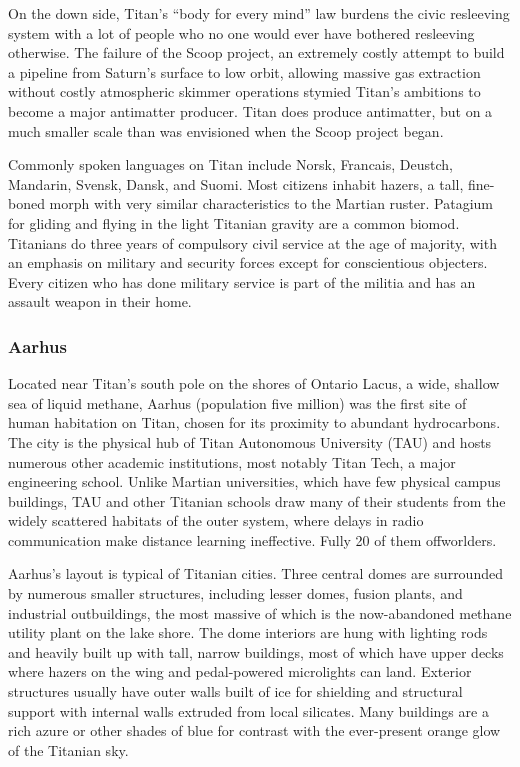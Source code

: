 On the down side, Titan's ``body for every mind'' 
law burdens the civic resleeving system with a lot of 
people who no one would ever have bothered resleeving
otherwise. The failure of the Scoop project, an
extremely costly attempt to build a pipeline from 
Saturn's surface to low orbit, allowing massive gas 
extraction without costly atmospheric skimmer operations
stymied Titan's ambitions to become a major
antimatter producer. Titan does produce antimatter, 
but on a much smaller scale than was envisioned 
when the Scoop project began.

Commonly spoken languages on Titan include 
Norsk, Francais, Deustch, Mandarin, Svensk, Dansk, 
and Suomi. Most citizens inhabit hazers, a tall, fine-boned
morph with very similar characteristics to
the Martian ruster. Patagium for gliding and flying 
in the light Titanian gravity are a common biomod. 
Titanians do three years of compulsory civil service 
at the age of majority, with an emphasis on military 
and security forces except for conscientious objecters. 
Every citizen who has done military service is part of 
the militia and has an assault weapon in their home.

\subsubsection{Aarhus}

Located near Titan's south pole on the shores of Ontario
Lacus, a wide, shallow sea of liquid methane,
Aarhus (population five million) was the first site of 
human habitation on Titan, chosen for its proximity 
to abundant hydrocarbons. The city is the physical 
hub of Titan Autonomous University (TAU) and hosts 
numerous other academic institutions, most notably 
Titan Tech, a major engineering school. Unlike Martian
universities, which have few physical campus
buildings, TAU and other Titanian schools draw 
many of their students from the widely scattered 
habitats of the outer system, where delays in radio 
communication make distance learning ineffective. 
Fully 20%
of them offworlders.

Aarhus's layout is typical of Titanian cities. Three 
central domes are surrounded by numerous smaller 
structures, including lesser domes, fusion plants, and 
industrial outbuildings, the most massive of which is 
the now-abandoned methane utility plant on the lake 
shore. The dome interiors are hung with lighting rods 
and heavily built up with tall, narrow buildings, most 
of which have upper decks where hazers on the wing 
and pedal-powered microlights can land. Exterior 
structures usually have outer walls built of ice for 
shielding and structural support with internal walls 
extruded from local silicates. Many buildings are a 
rich azure or other shades of blue for contrast with 
the ever-present orange glow of the Titanian sky.

